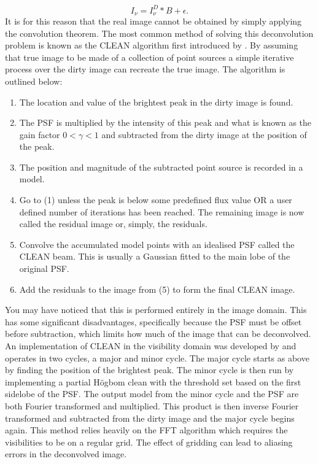 \begin{equation}
\label{eq:int_convolutionnoise}
I_\nu = I_\nu^D \ast B + \epsilon.
\end{equation}
It is for this reason that the real image cannot be obtained by simply applying the convolution theorem.  The most common method of solving this deconvolution problem is known as the CLEAN algorithm first introduced by \cite{Hogbom1974}. By assuming that true image to be made of a collection of point sources a simple iterative process over the dirty image can recreate the true image. The algorithm is outlined below:
\begin{enumerate}
\item The location and value of the brightest peak in the dirty image is found.
\item The PSF is multiplied by the intensity of this peak and what is known as the gain factor $0 < \gamma < 1$ and subtracted from the dirty image at the position of the peak.
\item The position and magnitude of the subtracted point source is recorded in a model.
\item Go to (1) unless the peak is below some predefined flux value OR a user defined number of iterations has been reached. The remaining image is now called the residual image or, simply, the residuals. 
\item Convolve the accumulated model points with an idealised PSF called the CLEAN beam. This is usually a Gaussian fitted to the main lobe of the original PSF.
\item Add the residuals to the image from (5) to form the final CLEAN image.
\end{enumerate}
You may have noticed that this is performed entirely in the image domain. This has some significant disadvantages, specifically because the PSF must be offset before subtraction, which limits how much of the image that can be deconvolved. An implementation of CLEAN in the visibility domain was developed by \cite{Clark1980} and operates in two cycles, a major and minor cycle. The major cycle starts as above by finding the position of the brightest peak. The minor cycle is then run by implementing a partial H\"ogbom clean with the threshold set based on the first sidelobe of the PSF. The output model from the minor cycle and the PSF are both Fourier transformed and multiplied. This product is then inverse Fourier transformed and subtracted from the dirty image and the major cycle begins again. This method relies heavily on the FFT algorithm which requires the visibilities to be on a regular grid. The effect of gridding can lead to aliasing errors in the deconvolved image. 

